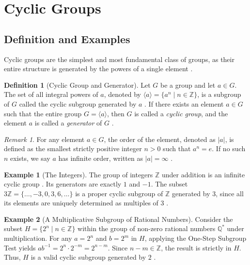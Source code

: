 \documentclass[11pt]{article}
\theoremstyle{definition}
\newtheorem{definition}{Definition}[section]
\newtheorem{example}{Example}[section]
\theoremstyle{plain}
\theoremstyle{remark}
\newtheorem*{remark}{Remark}
\begin{document}
\section{Cyclic Groups}

\subsection{Definition and Examples}

Cyclic groups are the simplest and most fundamental class of groups, as their entire structure is generated by the powers of a single element \cite{fraleigh}.

\begin{definition}[Cyclic Group and Generator]
Let $G$ be a group and let $a \in G$. The set of all integral powers of $a$, denoted by $\langle a \rangle = \{a^n \mid n \in \mathbb{Z}\}$, is a subgroup of $G$ called the cyclic subgroup generated by $a$ \cite{dummit}. If there exists an element $a \in G$ such that the entire group $G = \langle a \rangle$, then $G$ is called a \emph{cyclic group}, and the element $a$ is called a \emph{generator} of $G$ \cite{fraleigh}.
\end{definition}

\begin{remark}
For any element $a \in G$, the order of the element, denoted as $|a|$, is defined as the smallest strictly positive integer $n > 0$ such that $a^n = e$. If no such $n$ exists, we say $a$ has infinite order, written as $|a| = \infty$ \cite{gallian}.
\end{remark}

\begin{example}[The Integers]
The group of integers $\mathbb{Z}$ under addition is an infinite cyclic group \cite{fraleigh}. Its generators are exactly $1$ and $-1$. The subset $3\mathbb{Z} = \{\dots, -3, 0, 3, 6, \dots\}$ is a proper cyclic subgroup of $\mathbb{Z}$ generated by $3$, since all its elements are uniquely determined as multiples of $3$ \cite{dummit}.
\end{example}

\begin{example}[A Multiplicative Subgroup of Rational Numbers]
Consider the subset $H = \{2^n \mid n \in \mathbb{Z}\}$ within the group of non-zero rational numbers $\mathbb{Q}^*$ under multiplication. For any $a = 2^n$ and $b = 2^m$ in $H$, applying the One-Step Subgroup Test yields $a b^{-1} = 2^n \cdot 2^{-m} = 2^{n-m}$. Since $n-m \in \mathbb{Z}$, the result is strictly in $H$. Thus, $H$ is a valid cyclic subgroup generated by $2$ \cite{dummit}.
\end{example}
\end{document}
